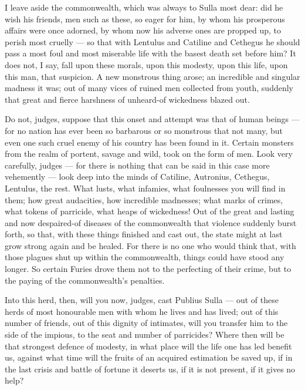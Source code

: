  I leave aside the commonwealth, which was always to Sulla most dear: did he wish his friends, men such as these, so eager for him, by whom his prosperous affairs were once adorned, by whom now his adverse ones are propped up, to perish most cruelly --- so that with Lentulus and Catiline and Cethegus he should pass a most foul and most miserable life with the basest death set before him? It does not, I say, fall upon these morals, upon this modesty, upon this life, upon this man, that suspicion. A new monstrous thing arose; an incredible and singular madness it was; out of many vices of ruined men collected from youth, suddenly that great and fierce harshness of unheard-of wickedness blazed out.

 Do not, judges, suppose that this onset and attempt was that of human beings --- for no nation has ever been so barbarous or so monstrous that not many, but even one such cruel enemy of his country has been found in it. Certain monsters from the realm of portent, savage and wild, took on the form of men. Look very carefully, judges --- for there is nothing that can be said in this case more vehemently --- look deep into the minds of Catiline, Autronius, Cethegus, Lentulus, the rest. What lusts, what infamies, what foulnesses you will find in them; how great audacities, how incredible madnesses; what marks of crimes, what tokens of parricide, what heaps of wickedness! Out of the great and lasting and now despaired-of diseases of the commonwealth that violence suddenly burst forth, so that, with these things finished and cast out, the state might at last grow strong again and be healed. For there is no one who would think that, with those plagues shut up within the commonwealth, things could have stood any longer. So certain Furies drove them not to the perfecting of their crime, but to the paying of the commonwealth's penalties.

 Into this herd, then, will you now, judges, cast Publius Sulla --- out of these herds of most honourable men with whom he lives and has lived; out of this number of friends, out of this dignity of intimates, will you transfer him to the side of the impious, to the seat and number of parricides? Where then will be that strongest defence of modesty, in what place will the life one has led benefit us, against what time will the fruits of an acquired estimation be saved up, if in the last crisis and battle of fortune it deserts us, if it is not present, if it gives no help?

